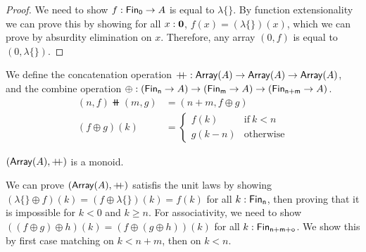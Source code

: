 \begin{proof}
    We need to show $f : \Fin[0] \to A$ is equal to $\lambda\{\}$. By function extensionality we can prove
    this by showing for all $x : {\mathbf{0}}$, $f(x) = (\lambda\{\})(x)$, which we can prove by absurdity elimination on $x$.
    Therefore, any array $(0, f)$ is equal to $(0, \lambda\{\})$.
\end{proof}

\begin{definition}[Concatenation]
    We define the concatenation operation $\mathbin{+\kern -0.4em+} : \operatorname{\mathsf{Array}}(A) \to \operatorname{\mathsf{Array}}(A) \to \operatorname{\mathsf{Array}}(A)$,
    and the combine operation $\oplus : (\Fin[n] \to A) \to (\Fin[m] \to A) \to (\Fin[n+m] \to\nolinebreak A)$.
    \begin{align*}
        (n , f) \doubleplus (m , g) & = (n + m , f \oplus g)        \\
        (f \oplus g)(k)             & = \begin{cases}
                                            f(k)     & \text{if}\ k < n \\
                                            g(k - n) & \text{otherwise}
                                        \end{cases}
    \end{align*}
\end{definition}

\begin{propositionrep}%
    $(\operatorname{\mathsf{Array}}(A), \mathbin{+\kern -0.4em+})$ is a monoid.
\end{propositionrep}

\begin{proofsketch}
    We can prove $(\operatorname{\mathsf{Array}}(A), \mathbin{+\kern -0.4em+})$ satisfis the unit laws by showing
    $(\lambda\{\} \oplus f)(k) = (f \oplus \lambda\{\})(k) = f(k)$ for all $k : \Fin[n]$,
    then proving that it is impossible for $k < 0$ and $k \geq n$. For associativity,
    we need to show $((f \oplus g) \oplus h)(k) = (f \oplus (g \oplus h))(k)$ for all $k : \Fin[n+m+o]$.
    We show this by first case matching on $k < n+m$, then on $k < n$.
\end{proofsketch}

